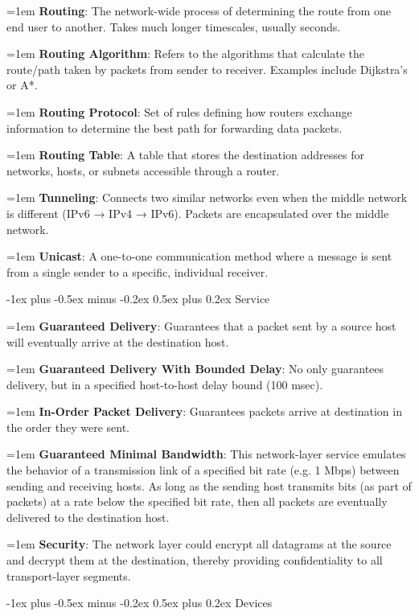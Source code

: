 \documentclass[letterpaper,8pt]{extarticle}
\makeatletter
\newcommand{\definition}[2]{
  \hangindent=1em
  \textbf{#1}: #2%
}
\renewcommand{\subsection}{\@startsection{subsection}{2}{0mm}%
  {-1ex plus -0.5ex minus -0.2ex}%
  {0.5ex plus 0.2ex}%
{\color{h2}\normalfont\fontsize{6}{6}\selectfont\bfseries}}
\makeatother
\begin{document}
\begin{multicols*}{5}
  \definition{Routing}{The network-wide process of determining the route from one end user to another. Takes much longer timescales, usually seconds.}

  \definition{Routing Algorithm}{Refers to the algorithms that calculate the route/path taken by packets from sender to receiver. Examples include Dijkstra's or A*.}

  \definition{Routing Protocol}{Set of rules defining how routers exchange information to determine the best path for forwarding data packets.}

  \definition{Routing Table}{A table that stores the destination addresses for networks, hosts, or subnets accessible through a router.}

  \definition{Tunneling}{Connects two similar networks even when the middle network is different (IPv6 → IPv4 → IPv6). Packets are encapsulated over the middle network.}

  \definition{Unicast}{A one-to-one communication method where a message is sent from a single sender to a specific, individual receiver.}

  \subsection{Service}

  \definition{Guaranteed Delivery}{Guarantees that a packet sent by a source host will eventually arrive at the destination host.}

  \definition{Guaranteed Delivery With Bounded Delay}{No only guarantees delivery, but in a specified host-to-host delay bound (100 msec).}

  \definition{In-Order Packet Delivery}{Guarantees packets arrive at destination in the order they were sent.}

  \definition{Guaranteed Minimal Bandwidth}{This network-layer service emulates the behavior of a transmission link of a specified bit rate (e.g. 1 Mbps) between sending and receiving hosts. As long as the sending host transmits bits (as part of packets) at a rate below the specified bit rate, then all packets are eventually delivered to the destination host.}

  \definition{Security}{The network layer could encrypt all datagrams at the source and decrypt them at the destination, thereby providing confidentiality to all transport-layer segments.}

  \subsection{Devices}


\end{multicols*}
\end{document}
